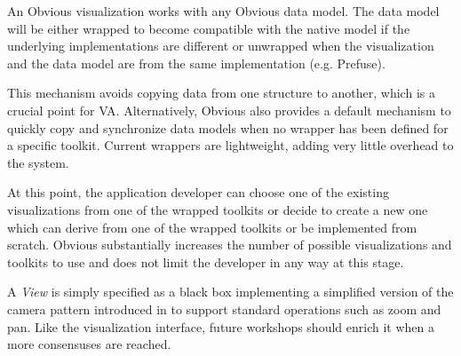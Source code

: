 
An Obvious visualization works with any Obvious data model.  The data
model will be either wrapped to become compatible with the native
model if the underlying implementations are different or unwrapped
when the visualization and the data model are from the same
implementation (e.g. Prefuse).

This mechanism avoids copying data from one structure to another,
which is a crucial point for VA.  Alternatively, Obvious
also provides a default mechanism to quickly copy and synchronize data
models when no wrapper has been defined for a specific toolkit.
Current wrappers are lightweight, adding very little overhead to the
system.

At this point, the application developer can choose one of the
existing visualizations from one of the wrapped toolkits or decide to
create a new one which can derive from one of the wrapped toolkits or
be implemented from scratch.  Obvious substantially increases the
number of possible visualizations and toolkits to use and does not
limit the developer in any way at this stage.

A \emph{View} is simply specified as a black box implementing a
simplified version of the camera pattern introduced in
\cite{DesignPatternsIV} to support standard operations such as zoom
and pan.  Like the visualization interface, future workshops should
enrich it when a more consensuses are reached.

